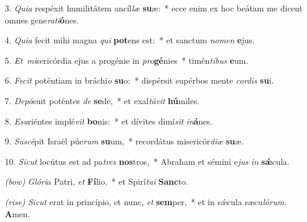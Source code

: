 3. \textit{Quia} respéxit humilitátem ancíl\textit{læ} \textbf{su}æ:~* ecce enim ex hoc beátam me dicent omnes gene\textit{ra}\textit{ti}\textbf{ó}nes.

4. \textit{Quia} fecit mihi magna \textit{qui} \textbf{pot}ens est:~* et sanctum \textit{no}\textit{men} \textbf{e}jus.

5. \textit{Et\ mi}sericórdia ejus a progénie in \textit{pro}\textbf{gé}nies~* timén\textit{ti}\textit{bus} \textbf{e}um.

6. \textit{Fecit} poténtiam in bráchi\textit{o} \textbf{su}o:~* dispérsit supérbos mente \textit{cor}\textit{dis} \textbf{su}i.

7. \textit{Depó}suit poténtes \textit{de} \textbf{se}de,~* et exal\textit{tá}\textit{vit} \textbf{hú}miles.

8. \textit{Esu}riéntes implé\textit{vit} \textbf{bo}nis:~* et dívites dimí\textit{sit} \textit{in}\textbf{á}nes.

9. \textit{Suscé}pit Israël púe\textit{rum} \textbf{su}um,~* recordátus misericór\textit{di}\textit{æ} \textbf{su}æ.

10. \textit{Sicut} locútus est ad pa\textit{tres} \textbf{nos}tros,~* Abraham et sémini e\textit{jus} \textit{in} \textbf{s\'{\ae}}cula.

{\color{red}\textit{(bow)}} \textit{Glóri}a Patri, \textit{et} \textbf{Fí}lio,~* et Spirí\textit{tu}\textit{i} \textbf{Sanc}to.

{\color{red}\textit{(rise)}} \textit{Sicut} erat in princípio, et nunc, \textit{et} \textbf{sem}per,~* et in s\'{\ae}cula sæcu\textit{ló}\textit{rum}. \textbf{A}men.